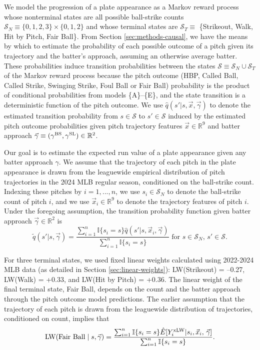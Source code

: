 \documentclass[
  12pt]{article}
\begin{document}
      We model the progression of a plate appearance as a Markov reward process whose nonterminal states are all possible ball-strike counts $\mathcal{S}_N \equiv \{0, 1, 2, 3\} \times \{0, 1, 2\}$ and whose terminal states are $\mathcal{S}_T \equiv$ \{Strikeout, Walk, Hit by Pitch, Fair Ball\}. From Section \ref{sec:methods-causal}, we have the means by which to estimate the probability of each possible outcome of a pitch given its trajectory and the batter's approach, assuming an otherwise average batter. These probabilities induce transition probabilities between the states $\mathcal{S} \equiv \mathcal{S}_N \cup \mathcal{S}_T$ of the Markov reward process because the pitch outcome (HBP, Called Ball, Called Strike, Swinging Strike, Foul Ball or Fair Ball) probability is the product of conditional probabilities from models \{A\}--\{E\}, and the state transition is a deterministic function of the pitch outcome. We use $\hat q(s' | s, \vec x, \vec \gamma)$ to denote the estimated transition probability from $s \in \mathcal{S}$ to $s' \in \mathcal{S}$ induced by the estimated pitch outcome probabilities given pitch trajectory features $\vec x \in \mathbb{R}^9$ and batter approach $\vec\gamma \equiv (\gamma^{\mbox{\scriptsize BS}}, \gamma^{\mbox{\scriptsize SL}}) \in \mathbb{R}^2$.

      Our goal is to estimate the expected run value of a plate appearance given any batter approach $\gamma$. We assume that the trajectory of each pitch in the plate appearance is drawn from the leaguewide empirical distribution of pitch trajectories in the 2024 MLB regular season, conditioned on the ball-strike count. Indexing these pitches by $i = 1, ..., n$, we use $s_i \in \mathcal{S}_N$ to denote the ball-strike count of pitch $i$, and we use $\vec x_i \in \mathbb{R}^9$ to denote the trajectory features of pitch $i$. Under the foregoing assumption, the transition probability function given batter approach $\vec\gamma \in \mathbb{R}^2$ is
      \begin{equation*}
        \tilde q(s' | s, \vec\gamma) = \frac{
          \sum_{i = 1}^n \mathbb{I}\{s_i = s\} \hat q(s' | s, \vec x_i, \vec\gamma)
        }{
          \sum_{i = 1}^n \mathbb{I}\{s_i = s\}
        } \mbox{ for }s \in \mathcal{S}_N,\, s' \in \mathcal{S}.
      \end{equation*}

      For three terminal states, we used fixed linear weights calculated using 2022-2024 MLB data (as detailed in Section \ref{sec:linear-weights}): LW(Strikeout) = --0.27, LW(Walk) = +0.33, and LW(Hit by Pitch) = +0.36. The linear weight of the final terminal state, Fair Ball, depends on the count and the batter approach through the pitch outcome model predictions. The earlier assumption that the trajectory of each pitch is drawn from the leaguewide distribution of trajectories, conditioned on count, implies that
      \begin{equation*}
        \mbox{LW}(\mbox{Fair Ball} \mid s, \vec\gamma) = \frac{
          \sum_{i = 1}^n \mathbb{I}\{s_i = s\} \hat E[Y_i^{\mbox{\scriptsize xLW}} | s_i, \vec x_i,\, \vec\gamma]
        }{
          \sum_{i = 1}^n \mathbb{I}\{s_i = s\}
        }.
      \end{equation*}
\end{document}
